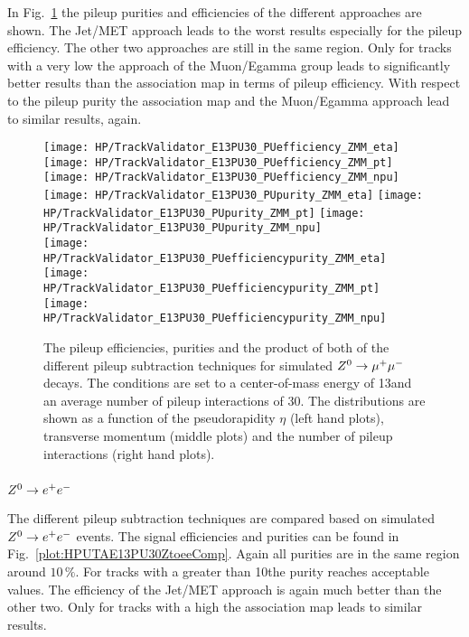 In Fig.~\ref{plot:HPUTAE13PU30ZtomumuPUComp} the pileup purities and efficiencies of the different approaches are shown. The Jet/MET approach leads to the worst results especially for the pileup efficiency. The other two approaches are still in the same region. Only for tracks with a very low \pt the approach of the Muon/Egamma group leads to significantly better results than the association map in terms of pileup efficiency. With respect to the pileup purity the association map and the Muon/Egamma approach lead to similar results, again. 

\begin{figure}[!t]
  \centering
  \texttt{[image: HP/TrackValidator\_E13PU30\_PUefficiency\_ZMM\_eta]}
  \texttt{[image: HP/TrackValidator\_E13PU30\_PUefficiency\_ZMM\_pt]}
  \texttt{[image: HP/TrackValidator\_E13PU30\_PUefficiency\_ZMM\_npu]}
   \\
  \texttt{[image: HP/TrackValidator\_E13PU30\_PUpurity\_ZMM\_eta]}
  \texttt{[image: HP/TrackValidator\_E13PU30\_PUpurity\_ZMM\_pt]}
  \texttt{[image: HP/TrackValidator\_E13PU30\_PUpurity\_ZMM\_npu]}
   \\
  \texttt{[image: HP/TrackValidator\_E13PU30\_PUefficiencypurity\_ZMM\_eta]}
  \texttt{[image: HP/TrackValidator\_E13PU30\_PUefficiencypurity\_ZMM\_pt]}
  \texttt{[image: HP/TrackValidator\_E13PU30\_PUefficiencypurity\_ZMM\_npu]}
  \caption[Pileup efficiencies, purities and their product of the different pileup subtraction techniques for $\Zz\rightarrow\MM$ decays with 13\TeV and PU=30]{The pileup efficiencies, purities and the product of both of the different pileup subtraction techniques for simulated $\Zz\rightarrow\MM$ decays. The conditions are set to a center-of-mass energy of 13\TeV and an average number of pileup interactions of 30. The distributions are shown as a function of the pseudorapidity $\eta$ (left hand plots), transverse momentum (middle plots) and the number of pileup interactions (right hand plots). \label{plot:HPUTAE13PU30ZtomumuPUComp}}
\end{figure}

\subsubsection{${Z^{0}}\rightarrow e^+e^-$ \label{sec:HPUTAE13PU30Ztoee}}

The different pileup subtraction techniques are compared based on simulated ${Z^{0}}\rightarrow e^+e^-$ events. The signal efficiencies and purities can be found in Fig.~\ref{plot:HPUTAE13PU30ZtoeeComp}. Again all purities are in the same region around $10\,\%$. For tracks with a \pt greater than 10\GeV the purity reaches acceptable values. The efficiency of the Jet/MET approach is again much better than the other two. Only for tracks with a high \pt the association map leads to similar results. 

